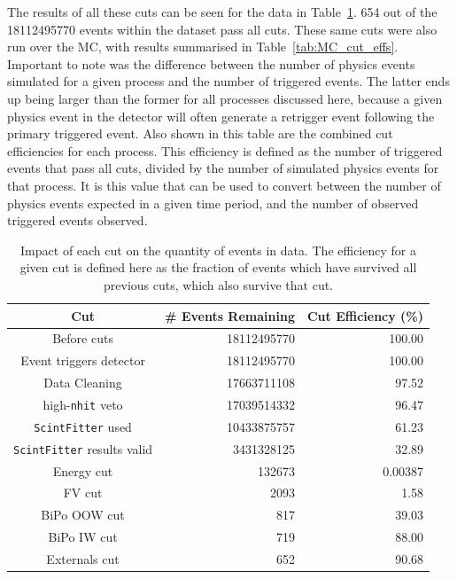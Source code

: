 The results of all these cuts can be seen for the data in Table~\ref{tab:data_cut_effs}. 654 out of the \num{18112495770} events within the dataset pass all cuts. These same cuts were also run over the MC, with results summarised in Table~\ref{tab:MC_cut_effs}. Important to note was the difference between the number of physics events simulated for a given process and the number of triggered events. The latter ends up being larger than the former for all processes discussed here, because a given physics event in the detector will often generate a retrigger event following the primary triggered event. Also shown in this table are the combined cut efficiencies for each process. This efficiency is defined as the number of triggered events that pass all cuts, divided by the number of simulated physics events for that process. It is this value that can be used to convert between the number of physics events expected in a given time period, and the number of observed triggered events observed.

\begin{table}
    \centering
    \begin{tabular}{c r r}
        \hline
        Cut                         & \# Events Remaining & Cut Efficiency (\%) \\ \hline \hline
        Before cuts                 & \num{18112495770} & 100.00   \\
        Event triggers detector     & \num{18112495770} & 100.00   \\
        Data Cleaning               & \num{17663711108} & 97.52    \\
        high-\texttt{nhit} veto     & \num{17039514332} & 96.47    \\
        \texttt{ScintFitter} used   & \num{10433875757} & 61.23    \\
        \texttt{ScintFitter} results valid & \num{3431328125} & 32.89 \\
        Energy cut                  & \num{132673}      & 0.00387 \\
        FV cut                      & \num{2093}        & 1.58    \\
        BiPo OOW cut                & \num{817}         & 39.03   \\
        BiPo IW cut                 & \num{719}         & 88.00   \\
        Externals cut               & \num{652}         & 90.68   \\
        \hline
    \end{tabular}
    \caption{Impact of each cut on the quantity of events in data. The efficiency for a given cut is defined here as the fraction of events which have survived all previous cuts, which also survive that cut.}
    \label{tab:data_cut_effs}
\end{table}

